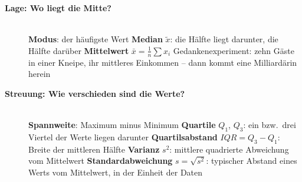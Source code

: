 \begin{description}
\item[{\rot\bf Lage: Wo liegt die Mitte?}]~\\[-\lblskip]
\bi
  \ite \textbf{Modus}: der häufigste Wert
  \ite \textbf{Median} $\tilde{x}$: die Hälfte liegt darunter, die Hälfte
    darüber
  \ite \textbf{Mittelwert} $\bar{x} = \frac{1}{n}\sum x_i$
  \ite Gedankenexperiment: zehn Gäste in einer Kneipe, ihr mittleres
    Einkommen -- dann kommt eine Milliardärin herein
\ei
{}
\os{\newpage}

\item[{\rot\bf Streuung: Wie verschieden sind die Werte?}]~\\[-\lblskip]
\bi
  \ite \textbf{Spannweite}: Maximum minus Minimum
  \ite \textbf{Quartile} $Q_1$, $Q_3$: ein bzw.\ drei Viertel der Werte
    liegen darunter
  \ite \textbf{Quartilsabstand} $\mathit{IQR} = Q_3 - Q_1$: Breite der
    mittleren Hälfte
  \ite \textbf{Varianz} $s^2$: mittlere quadrierte Abweichung vom
    Mittelwert
  \ite \textbf{Standardabweichung} $s=\sqrt{s^2}$: typischer Abstand
    eines Werts vom Mittelwert, in der Einheit der Daten
\ei
\os{\newpage}


\end{description}

